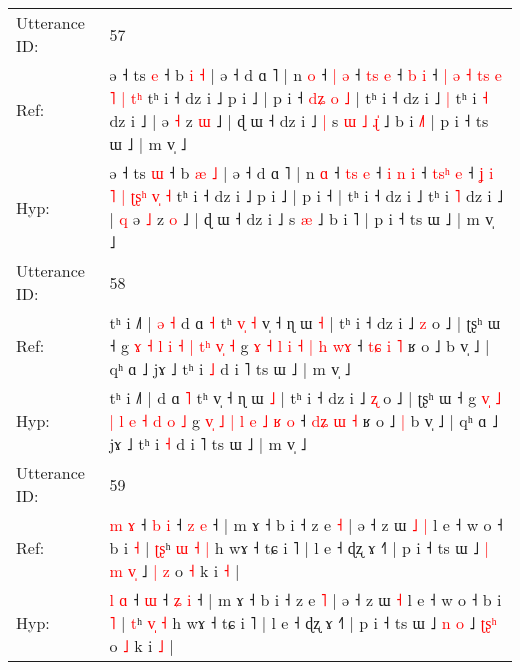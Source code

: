 \documentclass[10pt]{article}
\DeclareRobustCommand{\hl}[1]{{\textcolor{red}{#1}}}
\begin{document}
\begin{longtable}{ll}
 \\
\midrule
Utterance ID: & 57 \\
Ref: & ə ˧ ts \hl{e} ˧ b \hl{i} \hl{˧} | ə ˧ d ɑ ˥ | n \hl{o} ˧ \hl{}\hl{|} \hl{ə} ˧ \hl{}\hl{t}\hl{s} \hl{e} ˧ \hl{}\hl{}\hl{b} \hl{i} ˧ \hl{|} \hl{ə} \hl{˧} \hl{t}\hl{s} \hl{e}\hl{ }\hl{˥} \hl{|}\hl{ }\hl{t}\hl{ʰ} tʰ i ˧ dz i ˩ p i ˩ | p i ˧\hl{ }\hl{d}\hl{ʑ}\hl{ }\hl{o}\hl{ }\hl{˩} | tʰ i ˧ dz i ˩\hl{ }\hl{|} tʰ i \hl{˧} dz i ˩ |\hl{}\hl{} ə \hl{˧} z \hl{ɯ} ˩ | ɖ ɯ ˧ dz i ˩\hl{ }\hl{|} s\hl{ }\hl{ɯ}\hl{ }\hl{˩} \hl{ɻ}\hl{̍} ˩ b i \hl{˩}˥ | p i ˧ ts ɯ ˩ | m v̩ ˩
 \\
Hyp: & ə ˧ ts \hl{ɯ} ˧ b \hl{æ} \hl{˩} | ə ˧ d ɑ ˥ | n \hl{ɑ} ˧ \hl{t}\hl{s} \hl{e} ˧ \hl{i}\hl{ }\hl{n} \hl{i} ˧ \hl{t}\hl{s}\hl{ʰ} \hl{e} ˧ \hl{ʝ} \hl{i} \hl{˥} \hl{}\hl{|} \hl{ʈ}\hl{ʂ}\hl{ʰ} \hl{v}\hl{̩}\hl{ }\hl{˧} tʰ i ˧ dz i ˩ p i ˩ | p i ˧\hl{}\hl{}\hl{}\hl{}\hl{}\hl{}\hl{} | tʰ i ˧ dz i ˩\hl{}\hl{} tʰ i \hl{˥} dz i ˩ |\hl{ }\hl{q} ə \hl{˩} z \hl{o} ˩ | ɖ ɯ ˧ dz i ˩\hl{}\hl{} s\hl{}\hl{}\hl{}\hl{} \hl{}\hl{æ} ˩ b i \hl{}˥ | p i ˧ ts ɯ ˩ | m v̩ ˩
 \\
\midrule
Utterance ID: & 58 \\
Ref: & tʰ i ˩˥ |\hl{ }\hl{ə}\hl{ }\hl{˧} d ɑ \hl{˧} tʰ\hl{ }\hl{v}\hl{̩}\hl{ }\hl{˧} v̩ ˧ ɳ ɯ \hl{˧} | tʰ i ˧ dz i ˩ \hl{z} o ˩ | ʈʂʰ ɯ ˧ g \hl{}\hl{ɤ} \hl{˧} \hl{l} \hl{i} \hl{˧} \hl{|} \hl{t}\hl{ʰ} \hl{v}\hl{̩} \hl{˧} g \hl{}\hl{ɤ} \hl{˧} \hl{l} \hl{i} \hl{˧} \hl{|} \hl{h} \hl{w}\hl{ɤ} ˧ \hl{t}\hl{ɕ} \hl{i} \hl{˥} ʁ o ˩\hl{}\hl{} b v̩ ˩ | qʰ ɑ ˩ jɤ ˩ tʰ i \hl{˩} d i ˥ ts ɯ ˩ | m v̩ ˩
 \\
Hyp: & tʰ i ˩˥ |\hl{}\hl{}\hl{}\hl{} d ɑ \hl{˥} tʰ\hl{}\hl{}\hl{}\hl{}\hl{} v̩ ˧ ɳ ɯ \hl{˩} | tʰ i ˧ dz i ˩ \hl{ʐ} o ˩ | ʈʂʰ ɯ ˧ g \hl{v}\hl{̩} \hl{˩} \hl{|} \hl{l} \hl{e} \hl{˧} \hl{}\hl{d} \hl{}\hl{o} \hl{˩} g \hl{v}\hl{̩} \hl{˩} \hl{|} \hl{l} \hl{e} \hl{˩} \hl{ʁ} \hl{}\hl{o} ˧ \hl{d}\hl{ʑ} \hl{ɯ} \hl{˧} ʁ o ˩\hl{ }\hl{|} b v̩ ˩ | qʰ ɑ ˩ jɤ ˩ tʰ i \hl{˧} d i ˥ ts ɯ ˩ | m v̩ ˩
 \\
\midrule
Utterance ID: & 59 \\
Ref: & \hl{m} \hl{ɤ} ˧\hl{ }\hl{b} \hl{i} ˧ \hl{z} \hl{e} ˧ | m ɤ ˧ b i ˧ z e \hl{˧} | ə ˧ z ɯ\hl{ }\hl{˩} \hl{|} l e ˧ w o ˧ b i \hl{˧} | \hl{ʈ}\hl{ʂ}ʰ \hl{ɯ}\hl{ }\hl{˧} \hl{|} h wɤ ˧ tɕ i ˥ | l e ˧ ɖʐ ɤ ˧˥ | p i ˧ ts ɯ ˩\hl{ }\hl{|} \hl{m} \hl{v}\hl{̩} ˩ \hl{|}\hl{ }\hl{z} o \hl{˧} k i \hl{˧} |
 \\
Hyp: & \hl{l} \hl{ɑ} ˧\hl{}\hl{} \hl{ɯ} ˧ \hl{ʑ} \hl{i} ˧ | m ɤ ˧ b i ˧ z e \hl{˥} | ə ˧ z ɯ\hl{}\hl{} \hl{˧} l e ˧ w o ˧ b i \hl{˥} | \hl{}\hl{t}ʰ \hl{}\hl{v}\hl{̩} \hl{˧} h wɤ ˧ tɕ i ˥ | l e ˧ ɖʐ ɤ ˧˥ | p i ˧ ts ɯ ˩\hl{}\hl{} \hl{n} \hl{}\hl{o} ˩ \hl{ʈ}\hl{ʂ}\hl{ʰ} o \hl{˩} k i \hl{˩} |

\end{longtable}
\end{document}
